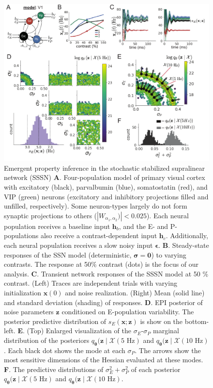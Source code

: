 \documentclass[11pt]{article}
\begin{document}
\begin{figure}
\vspace{-1cm}
\begin{center}
\includegraphics[scale=0.8]{figures/fig2/fig2.pdf}
\end{center}
\vspace{-1cm}
\caption{\small Emergent property inference in the stochastic stabilized supralinear network (SSSN)
\textbf{A}.  Four-population model of primary visual cortex with excitatory (black), parvalbumin (blue), somatostatin (red), and VIP (green) neurons (excitatory and inhibitory projections filled and unfilled, respectively).   
Some neuron-types largely do not form synaptic projections to others ($|W_{\alpha_1, \alpha_2})| < 0.025$).
Each neural population receives a baseline input $\mathbf{h}_b$, and the E- and P-populations also receive a contrast-dependent input $\mathbf{h}_c$.
Additionally, each neural population receives a slow noisy input $\bm{\epsilon}$.
\textbf{B}. Steady-state responses of the SSN model (deterministic, $\bm{\sigma}=\bm{0}$) to varying contrasts.  The response at 50\% contrast (dots) is the focus of our analysis.
\textbf{C}. Transient network responses of the SSSN model at 50 \% contrast. (Left) Traces are independent trials with varying initialization $\mathbf{x}(0)$ and noise realization. (Right) Mean (solid line) and standard deviation (shading) of responses.
\textbf{D}. EPI posterior of noise parameters $\mathbf{z}$ conditioned on E-population variability.
The posterior predictive distribution of $s_E(\mathbf{x}; \mathbf{z})$ is show on the bottom-left.
\textbf{E}. (Top) Enlarged visualization of the $\sigma_E$-$\sigma_P$ marginal distribution of the posteriors $q_{\bm{\theta}}(\mathbf{z} \mid \mathcal{X}(5\text{ Hz})$ and $q_{\bm{\theta}}(\mathbf{z} \mid \mathcal{X}(10\text{ Hz})$.
Each black dot shows the mode at each $\sigma_P$.
The arrows show the most sensitive dimensions of the Hessian evaluated at these modes.
\textbf{F}. The predictive distributions of $\sigma_E^2 + \sigma_P^2$ of each posterior $q_{\bm{\theta}}(\mathbf{z} \mid \mathcal{X}(5\text{ Hz})$ and $q_{\bm{\theta}}(\mathbf{z} \mid \mathcal{X}(10\text{ Hz})$.
}
 \label{fig:V1}
\end{figure}
\end{document}
